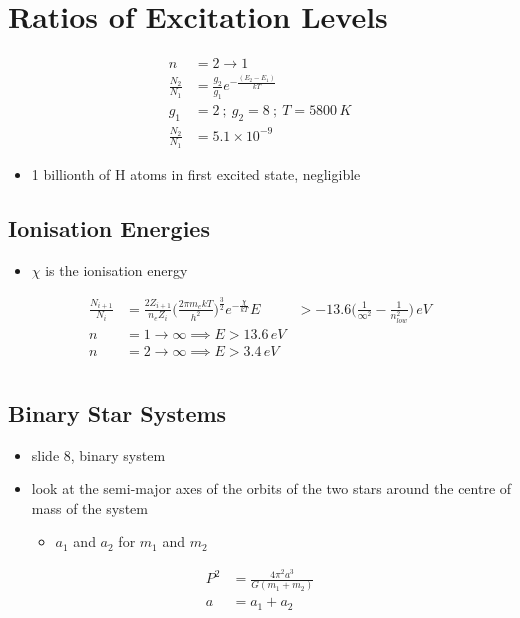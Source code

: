\documentclass[a4paper,11pt,normalem]{article}
\begin{document}
\section{Ratios of Excitation Levels}
\begin{align}
    n &= 2 \to 1 \\
    \frac{N_2}{N_1} &= \frac{g_2}{g_1} e^{-\frac{(E_2 - E_1)}{kT}} \\
    g_1 &= 2 ~;~ g_2 = 8 ~;~ T = 5800\,K \\
    \frac{N_2}{N_1} &= 5.1 \times 10^{-9}
\end{align}
\begin{itemize}
    \item 1 billionth of H atoms in first excited state, negligible
\end{itemize}

\subsection{Ionisation Energies}
\begin{itemize}
    \item \(\chi\) is the ionisation energy
\end{itemize}
\begin{align}
    \frac{N_{i + 1}}{N_i} &= \frac{2Z_{i + 1}}{n_e Z_i} \Big(\frac{2\pi m_e kT}{h^2}\Big)^{\frac{3}{2}}e^{-\frac{\chi}{kT}}
    E &> -13.6\Big(\frac{1}{\infty^2} - \frac{1}{n_{low}^2} \Big)\, eV \\
    n &= 1 \to \infty \implies E > 13.6\,eV \\
    n &= 2 \to \infty \implies E > 3.4\,eV
\end{align}

\section{}
\subsection{Binary Star Systems}
\begin{itemize}
    \item slide 8, binary system
    \item look at the semi-major axes of the orbits of the two stars around the
  centre of mass of the system
        \begin{itemize}
            \item \(a_1\) and \(a_2\) for \(m_1\) and \(m_2\)
        \end{itemize}
\end{itemize}
\begin{align}
    P^2 &= \frac{4\pi^2 a^3}{G(m_1 + m_2)} \\
    a &= a_1 + a_2
\end{align}
\end{document}
